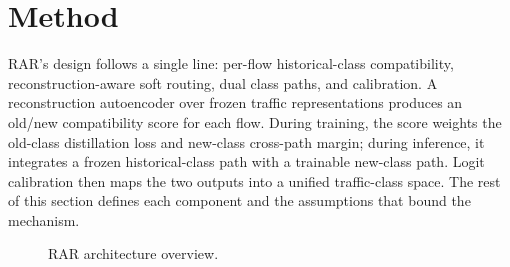 %
%

\section{Method}\label{sec:method}


RAR's design follows a single line: per-flow historical-class compatibility, reconstruction-aware soft routing, dual class paths, and calibration. A reconstruction autoencoder over frozen traffic representations produces an old/new compatibility score for each flow. During training, the score weights the old-class distillation loss and new-class cross-path margin; during inference, it integrates a frozen historical-class path with a trainable new-class path. Logit calibration then maps the two outputs into a unified traffic-class space. The rest of this section defines each component and the assumptions that bound the mechanism.

\begin{figure}[t]
\centering

\caption{RAR architecture overview.}
\label{fig:rar-architecture}
\end{figure}

